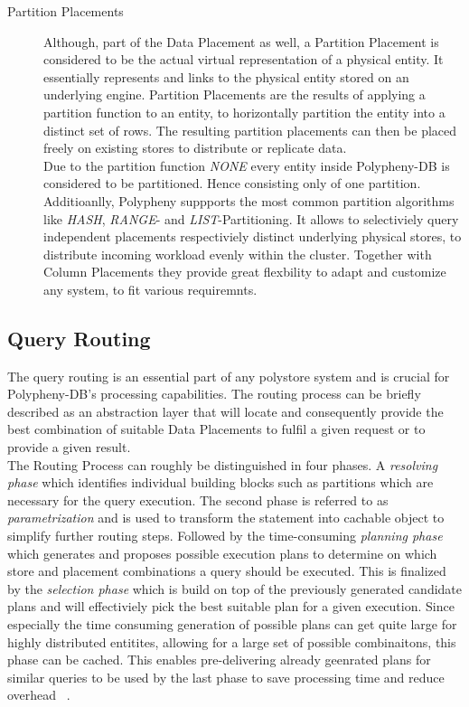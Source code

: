 \begin{description}
   

    \item [Partition Placements] Although, part of the Data Placement as well, a Partition Placement is considered to be the actual virtual representation of a physical entity.
    It essentially represents and links to the physical entity stored on an underlying engine. Partition Placements are the results of applying a partition function to an entity,
    to horizontally partition the entity into a distinct set of rows. The resulting partition placements can then be placed freely on existing stores to distribute or replicate data.\\
    Due to the partition function \emph{NONE} every entity inside Polypheny-DB is considered to be partitioned. Hence consisting only of one partition.
    Additioanlly, Polypheny suppports the most common partition algorithms like \emph{HASH}, \emph{RANGE}- and \emph{LIST}-Partitioning. 
    It allows to selectiviely query independent placements respectiviely distinct underlying physical stores, to distribute incoming workload evenly within the cluster.
    Together with Column Placements they provide great flexbility to adapt and customize any system, to fit various requiremnts.
    
\end{description}





\subsection{Query Routing}
\label{sec:routing}

The query routing is an essential part of any polystore system and is crucial for Polypheny-DB's processing capabilities.
The routing process can be briefly described as an abstraction layer that will locate and consequently provide the best combination of suitable Data Placements to fulfil a given request 
or to provide a given result. \\
The Routing Process can roughly be distinguished in four phases. A \emph{resolving phase} which identifies individual building blocks such as partitions which are necessary 
for the query execution. The second phase is referred to as \emph{parametrization} and is used to transform the statement into cachable object to simplify further routing steps.
Followed by the time-consuming \emph{planning phase} which generates and proposes possible execution plans to determine on which store and placement combinations a query should be executed.
This is finalized by the \emph{selection phase} which is build on top of the previously generated candidate plans and will effectiviely pick the best suitable plan for a 
given execution. Since especially the time consuming generation of possible plans can get quite large for highly distributed entitites, allowing for a large set of 
possible combinaitons, this phase can be cached.
This enables pre-delivering already geenrated plans for similar queries to be used by the last phase to save processing time and reduce overhead ~\cite{vogt_dis_2022}.\\


